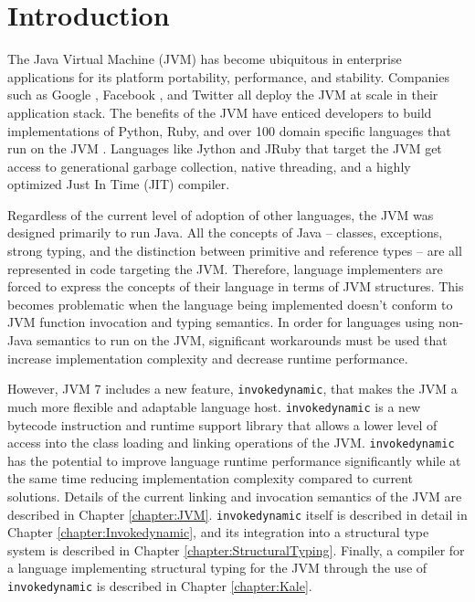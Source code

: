 \chapter{Introduction}
\label{Intro}
\lhead{ \leftmark }

The Java Virtual Machine (JVM) has become ubiquitous in enterprise applications for its platform portability, performance, and stability.  Companies such as Google \cite{google-jvm}, Facebook \cite{facebook-hbase}, and Twitter \cite{java-at-twitter} all deploy the JVM at scale in their application stack.  The benefits of the JVM have enticed developers to build implementations of Python, Ruby, and over 100 domain specific languages that run on the JVM \cite{jvm-lang-summit}.  Languages like Jython and JRuby that target the JVM get access to generational garbage collection, native threading, and a highly optimized Just In Time (JIT) compiler.  

Regardless of the current level of adoption of other languages, the JVM was designed primarily to run Java.  All the concepts of Java -- classes, exceptions, strong typing, and the distinction between primitive and reference types -- are all represented in code targeting the JVM.  Therefore, language implementers are forced to express the concepts of their language in terms of JVM structures.  This becomes problematic when the language being implemented doesn't conform to JVM function invocation and typing semantics.  In order for languages using non-Java semantics to run on the JVM, significant workarounds must be used that increase implementation complexity and decrease runtime performance.

However, JVM 7 includes a new feature, \texttt{invokedynamic}, that makes the JVM a much more flexible and adaptable language host.  \texttt{invokedynamic} is a new bytecode instruction and runtime support library that allows a lower level of access into the class loading and linking operations of the JVM.  \texttt{invokedynamic} has the potential to improve language runtime performance significantly while at the same time reducing implementation complexity compared to current solutions.  Details of the current linking and invocation semantics of the JVM are described in Chapter \ref{chapter:JVM}.  \texttt{invokedynamic} itself is described in detail in Chapter \ref{chapter:Invokedynamic}, and its integration into a structural type system is described in Chapter \ref{chapter:StructuralTyping}.  Finally, a compiler for a language implementing structural typing for the JVM through the use of \texttt{invokedynamic} is described in Chapter \ref{chapter:Kale}.


